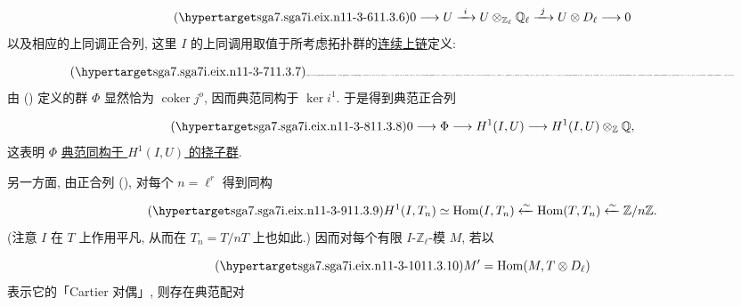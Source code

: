\begin{equation}\tag{\SGARefTarget{sga7.sga7i.eix.n11-3-6}{11.3.6}}
0\longrightarrow U\xrightarrow{\ i\ }
 U\otimes_{\mathbb Z_\ell}\mathbb Q_\ell
 \xrightarrow{\ j\ }U\otimes D_\ell\longrightarrow0
\end{equation}
以及相应的上同调正合列, 这里 $I$ 的上同调用取值于所考虑拓扑群的\underline{连续上链}定义:

\begin{equation}\tag{\SGARefTarget{sga7.sga7i.eix.n11-3-7}{11.3.7}}
\resizebox{\textwidth}{!}{%
\begin{tikzcd}[ampersand replacement=\&, column sep=small, row sep=large]
0 \arrow[r]
 \& H^o(I,U) \arrow[r, "i^o"] \arrow[d, no head, "\wr"]
 \& H^o(I,U\otimes\mathbb Q_\ell) \arrow[r, "j^o"]
      \arrow[d, no head, "\wr"]
 \& H^o(I,U\otimes D_\ell) \arrow[r, "\partial"]
      \arrow[d, no head, "\wr"]
 \& H^1(I,U) \arrow[r, "i^1"]
 \& H^1(I,U\otimes\mathbb Q_\ell) \arrow[d, no head, "\wr"] \\
{}
 \& U^I
 \& (U\otimes\mathbb Q_\ell)^I\simeq U^I\otimes_{\mathbb Z}\mathbb Q
 \& (U\otimes D_\ell)^I
 \& {}
 \& H^1(I,U)\otimes_{\mathbb Z}\mathbb Q .
\end{tikzcd}}
\end{equation}
由 () 定义的群 $\Phi$ 显然恰为 $\operatorname{coker}j^o$, 因而典范同构于 $\ker i^1$. 于是得到典范正合列

\begin{equation}\tag{\SGARefTarget{sga7.sga7i.eix.n11-3-8}{11.3.8}}
0\longrightarrow\Phi\longrightarrow H^1(I,U)
 \longrightarrow H^1(I,U)\otimes_{\mathbb Z}\mathbb Q,
\end{equation}
这表明 $\Phi$ \underline{典范同构于 $H^1(I,U)$ 的挠子群}.

另一方面, 由正合列 (), 对每个 $n=\ell^r$ 得到同构

\begin{equation}\tag{\SGARefTarget{sga7.sga7i.eix.n11-3-9}{11.3.9}}
H^1(I,T_n)\simeq\operatorname{Hom}(I,T_n)
 \xleftarrow{\sim}\operatorname{Hom}(T,T_n)
 \xleftarrow{\sim}\mathbb Z/n\mathbb Z.
\end{equation}
(注意 $I$ 在 $T$ 上作用平凡, 从而在 $T_n=T/nT$ 上也如此.) 因而对每个有限 $I$-$\mathbb Z_\ell$-模 $M$, 若以

\begin{equation}\tag{\SGARefTarget{sga7.sga7i.eix.n11-3-10}{11.3.10}}
M'=\operatorname{Hom}(M,T\otimes D_\ell)
\end{equation}
表示它的「Cartier 对偶」, 则存在典范配对

